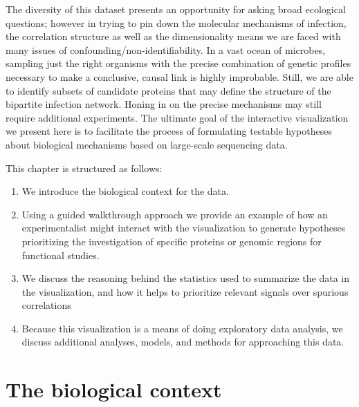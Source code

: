 \documentclass[12pt,twoside]{mitthesis-manusdown}
\begin{document}
The diversity of this dataset presents an opportunity for asking broad
ecological questions; however in trying to pin down the molecular
mechanisms of infection, the correlation structure as well as the
dimensionality means we are faced with many issues of
confounding/non-identifiability. In a vast ocean of microbes, sampling
just the right organisms with the precise combination of genetic
profiles necessary to make a conclusive, causal link is highly
improbable. Still, we are able to identify subsets of candidate proteins
that may define the structure of the bipartite infection network. Honing
in on the precise mechanisms may still require additional experiments.
The ultimate goal of the interactive visualization we present here is to
facilitate the process of formulating testable hypotheses about
biological mechanisms based on large-scale sequencing data.

This chapter is structured as follows:
\begin{enumerate}
\def\labelenumi{\arabic{enumi}.}
\item
  We introduce the biological context for the data.
\item
  Using a guided walkthrough approach we provide an example of how an
  experimentalist might interact with the visualization to generate
  hypotheses prioritizing the investigation of specific proteins or
  genomic regions for functional studies.
\item
  We discuss the reasoning behind the statistics used to summarize the
  data in the visualization, and how it helps to prioritize relevant
  signals over spurious correlations
\item
  Because this visualization is a means of doing exploratory data
  analysis, we discuss additional analyses, models, and methods for
  approaching this data.
\end{enumerate}
\section{The biological context}\label{the-biological-context}
\end{document}
